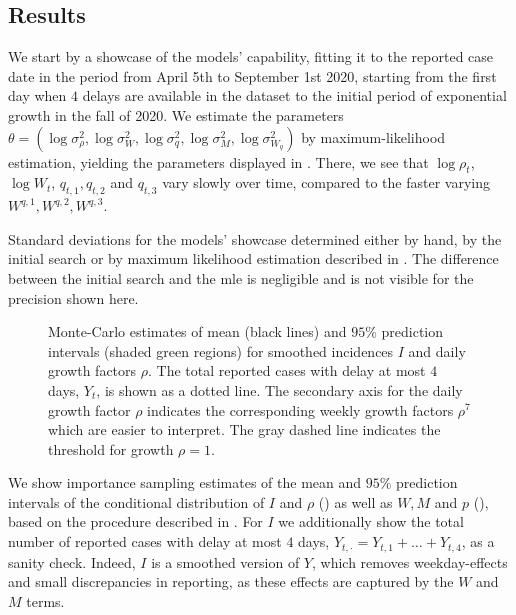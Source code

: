 \subsection{Results}
We start by a showcase of the models' capability, fitting it to the reported case date in the period from April 5th to September 1st 2020, starting from the first day when $4$ delays are available in the dataset to the initial period of exponential growth in the fall of 2020. We estimate the parameters $\theta = \left( \log \sigma^{2}_{\rho}, \log \sigma^{2}_W, \log \sigma^{2}_q, \log \sigma^{2}_M, \log \sigma^{2}_{W_{q}}\right)$ by maximum-likelihood estimation, yielding the parameters displayed in . There, we see that $\log \rho_{t}$, $\log W_{t}$, $q_{t,1}, q_{t,2}$ and $ q_{t,3}$ vary slowly over time, compared to the faster varying $W^{q, 1}, W^{q,2}, W^{q,3}$. 

\begin{table}
    \centering
    
    \caption{Standard deviations for the models' showcase determined either by hand, by the initial search or by maximum likelihood estimation described in . The difference between the initial search and the \acrshort{mle} is negligible and is not visible for the precision shown here.}
    \label{tab:showcase-parameters}
\end{table}
\begin{figure}
    \resizebox{\textwidth}{!}{%
    }
    \caption{Monte-Carlo estimates of mean (black lines) and $95\%$ prediction intervals (shaded green regions) for smoothed incidences $I$ and daily growth factors $\rho$. The total reported cases with delay at most $4$ days,  $Y_{t}$, is shown as a dotted line. The secondary axis for the daily growth factor $\rho$ indicates the corresponding weekly growth factors $\rho^{7}$ which are easier to interpret. The gray dashed line indicates the threshold for growth $\rho = 1$.}
    \label{fig:showcase_prediction_intervals_I_rho}
\end{figure}

We show importance sampling estimates of the mean and $95\%$ prediction intervals of the conditional distribution of $I$ and $\rho$ () as well as $W,M$ and $p$ (), based on the procedure described in . For $I$ we additionally show the total number of reported cases with delay at most $4$ days, $Y_{t,\cdot} = Y_{t, 1} + \dots + Y_{t, 4}$, as a sanity check. Indeed, $I$ is a smoothed version of $Y$, which removes weekday-effects and small discrepancies in reporting, as these effects are captured by the $W$ and $M$ terms.

